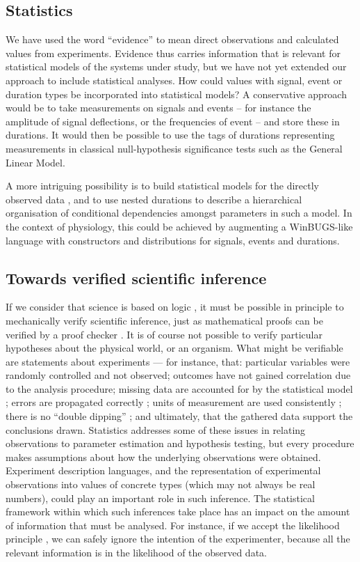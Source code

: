 \subsection*{Statistics}

We have used the word ``evidence'' to mean direct observations and
calculated values from experiments. Evidence thus carries information
that is relevant for statistical models of the systems under study,
but we have not yet extended our approach to include statistical
analyses. How could values with signal, event or duration types be
incorporated into statistical models? A conservative approach would be to
take measurements on signals and events -- for instance the amplitude
of signal deflections, or the frequencies of event -- and store these in
durations. It would then be possible to use the tags of durations
representing measurements in classical null-hypothesis significance
tests such as the General Linear Model. 

A more intriguing possibility is to build statistical models for the
directly observed data \citep{Daniell1991}, and to use nested
durations to describe a hierarchical organisation \citep{Rouder2003}
of conditional dependencies amongst parameters in such a model. In the
context of physiology, this could be achieved by augmenting a
WinBUGS-like \citep{Gilks1994} language with constructors and
distributions for signals, events and durations.


\subsection*{Towards verified scientific inference}

If we consider that science is based on logic \citep{Jaynes2003}, it
must be possible in principle to mechanically verify scientific
inference, just as mathematical proofs can be verified by a proof
checker \citep{Harrison2009}. It is of course not possible to verify
particular hypotheses about the physical world, or an organism. What
might be verifiable are statements about experiments --- for instance,
that: particular variables were randomly controlled and not observed;
outcomes have not gained correlation due to the analysis procedure;
missing data are accounted for by the statistical model
\citep{Gelman2003}; errors are propagated correctly
\citep{Taylor1997}; units of measurement are used consistently
\citep{Kennedy1997}; there is no ``double dipping''
\citep{Kriegeskorte2009}; and ultimately, that the gathered data
support the conclusions drawn. Statistics addresses some of these
issues in relating observations to parameter estimation and hypothesis
testing, but every procedure makes assumptions about how the
underlying observations were obtained. Experiment description
languages, and the representation of experimental observations into
values of concrete types (which may not always be real numbers),
could play an important role in such inference. The statistical
framework within which such inferences take place has an impact on the
amount of information that must be analysed. For instance, if we
accept the likelihood principle \citep{Jaynes2003}, we can safely
ignore the intention of the experimenter, because all the relevant
information is in the likelihood of the observed data.

